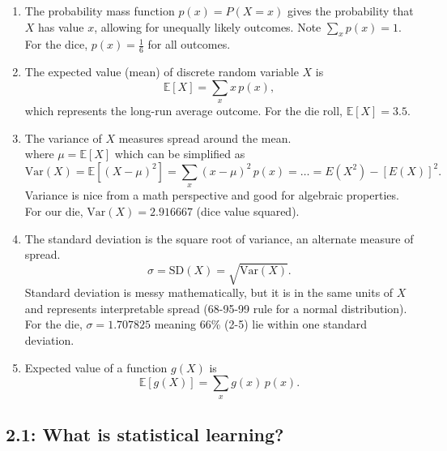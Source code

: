 \documentclass{article}
\begin{document}
\begin{enumerate}
\begin{enumerate}
\item The probability mass function $p(x) = P(X=x)$ gives the probability that $X$ has value $x$, allowing for unequally likely outcomes. Note $\sum_x p(x) = 1$. For the dice, $p(x) = \frac{1}{6}$ for all outcomes. 

\item The expected value (mean) of discrete random variable $X$ is
\[
\mathbb{E}[X] = \sum_x x \, p(x),
\]
which represents the long-run average outcome. For the die roll, $\mathbb{E}[X] = 3.5$.


\item The variance of $X$ measures spread around the mean.
\[
\]
where $\mu = \mathbb{E}[X]$ which can be simplified as
\[
\mathrm{Var}(X) = \mathbb{E}[(X - \mu)^2] = \sum_x (x - \mu)^2 \, p(x) = \dots = E(X^2) - [E(X)]^2.
\]
Variance is nice from a math perspective and good for algebraic properties. For our die, $\mathrm{Var}(X) = 2.916667$ (dice value squared).

\item The standard deviation is the square root of variance, an alternate measure of spread.
\[
\sigma = \mathrm{SD}(X) = \sqrt{\mathrm{Var}(X)}.
\]
Standard deviation is messy mathematically, but it is in the same units of $X$ and represents interpretable spread (68-95-99 rule for a normal distribution). For the die, $\sigma = 1.707825$ meaning 66\% (2-5) lie within one standard deviation.

\item Expected value of a function $g(X)$ is
\[
\mathbb{E}[g(X)] = \sum_x g(x) \, p(x).
\]

\end{enumerate}
\end{enumerate}

\subsection*{2.1: What is statistical learning?}
\end{document}
